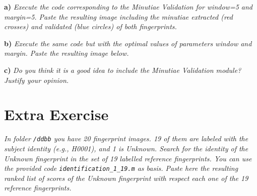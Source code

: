 \documentclass[11pt]{article}
\begin{document}
\textbf{a) }\emph{Execute the code corresponding to the Minutiae Validation for window=5 and margin=5.  Paste the resulting image including the minutiae extracted (red crosses) and validated (blue circles) of both fingerprints. }

\textbf{b) }\emph{Execute the same code but with the optimal values of parameters window and margin. Paste the resulting image below.}

\textbf{c) }\emph{Do you think it is a good idea to include the Minutiae Validation module? Justify your opinion.}

\section{Extra Exercise}

\emph{In folder \texttt{/ddbb} you have 20 fingerprint images. 19 of them are labeled with the subject identity (e.g., H0001), and 1 is Unknown. Search for the identity of the Unknown fingerprint in the set of 19 labelled reference fingerprints. You can use the provided code \texttt{identification\_1\_19.m} as basis. Paste here the resulting ranked list of scores of the Unknown fingerprint with respect each one of the 19 reference fingerprints.}
\end{document}
